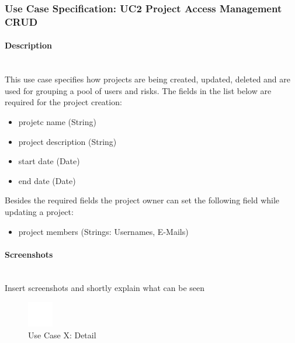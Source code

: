 
\newpage
\subsubsection{Use Case Specification: \ac{UC}2 Project Access Management CRUD}
\label{sec:domainBbc}

\paragraph*{Description}\mbox{}\\
This use case specifies how projects are being created, updated, deleted and are used for grouping a pool of users and risks.
The fields in the list below are required for the project creation:

\begin{itemize}
	\vspace{-3mm}
	\setlength\itemsep{-1em}
	\item projetc name (String)
	\item project description (String)
	\item start date (Date)
	\item end date (Date)
\end{itemize}
Besides the required fields the project owner can set the following field while updating a project:
\begin{itemize}
	\vspace{-3mm}
	\setlength\itemsep{-1em}
	\item project members (Strings: Usernames, E-Mails)
\end{itemize}

\paragraph*{Screenshots}\mbox{}\\
Insert screenshots and shortly explain what can be seen
\begin{figure}[h] 
	\centering
	\includegraphics[width=0.1\textwidth]{Content/Domain/placeholder.png}
	\caption{Use Case X: Detail}
	\label{fig:useCaseXDetailY}
\end{figure}


